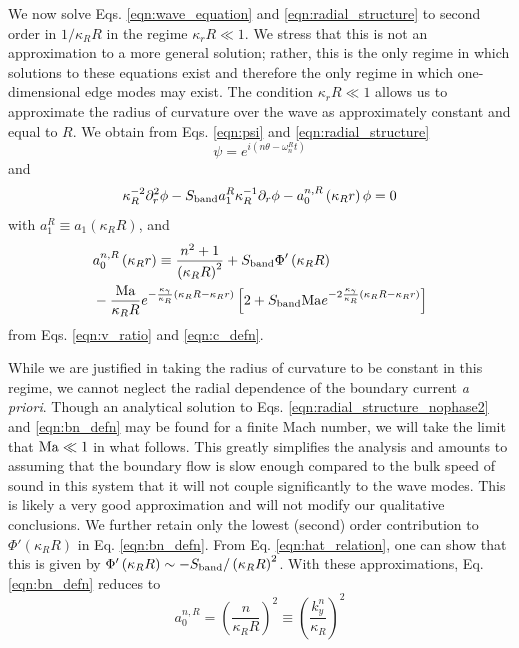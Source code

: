 \documentclass[%
 reprint,
superscriptaddress,
longbibliography,
 amsmath,amssymb,
 prl,
 citeautoscript,
]{revtex4-1}
\begin{document}
We now solve Eqs. \ref{eqn:wave_equation} and \ref{eqn:radial_structure} to second order in $1/\kappa_R R$ in the regime $\kappa_r R \ll 1$. We stress that this is not an approximation to a more general solution; rather, this is the only regime in which solutions to these equations exist and therefore the only regime in which one-dimensional edge modes may exist. The condition $\kappa_r R \ll 1$ allows us to approximate the radius of curvature over the wave as approximately constant and equal to $R$. We obtain from Eqs. \ref{eqn:psi} and \ref{eqn:radial_structure}
\begin{equation}
\psi = e^{i \left( n \theta - \omega_n^R t \right)}
\label{eqn:psi_thin}
\end{equation}
and
\begin{equation}
\kappa_R^{-2} \partial_r^2 \phi - S_{\rm band} a_1^R \kappa_R^{-1} \partial_r \phi - a_0^{n,R} \left( \kappa_R r \right) \phi = 0
\label{eqn:radial_structure_nophase2}
\end{equation}
with $a_1^R \equiv a_1 \left( \kappa_R R \right)$, and
\begin{equation}
\begin{split}
&a_0^{n,R} \left( \kappa_R r \right) \equiv \frac{n^2 + 1}{\left( \kappa_R R \right)^2} + S_{\rm band} \Phi' \left( \kappa_R R \right) \\
&- \frac{{\rm Ma}}{\kappa_R R} e^{- \frac{\kappa_{\gamma}}{\kappa_R} \left( \kappa_R R - \kappa_R r \right)} \left[ 2 + S_{\rm band} {\rm Ma} e^{- 2 \frac{\kappa_{\gamma}}{\kappa_R} \left( \kappa_R R - \kappa_R r \right)} \right]
\end{split}
\label{eqn:bn_defn}
\end{equation}
from Eqs. \ref{eqn:v_ratio} and \ref{eqn:c_defn}.

While we are justified in taking the radius of curvature to be constant in this regime, we cannot neglect the radial dependence of the boundary current {\it a priori}. Though an analytical solution to Eqs. \ref{eqn:radial_structure_nophase2} and \ref{eqn:bn_defn} may be found for a finite Mach number, we will take the limit that ${\rm Ma} \ll 1$ in what follows. This greatly simplifies the analysis and amounts to assuming that the boundary flow is slow enough compared to the bulk speed of sound in this system that it will not couple significantly to the wave modes. This is likely a very good approximation and will not modify our qualitative conclusions. We further retain only the lowest (second) order contribution to $\Phi'\left( \kappa_R R \right)$ in Eq. \ref{eqn:bn_defn}. From Eq. \ref{eqn:hat_relation}, one can show that this is given by $\Phi'\left( \kappa_R R \right) \sim - S_{\rm band} / \left( \kappa_R R \right)^2$. With these approximations, Eq. \ref{eqn:bn_defn} reduces to
\begin{equation}
a_0^{n,R} = \left( \frac{n}{\kappa_R R} \right)^2 \equiv \left( \frac{k_y^n}{\kappa_R} \right)^2
\label{eqn:bn_defn2}
\end{equation}
\end{document}
